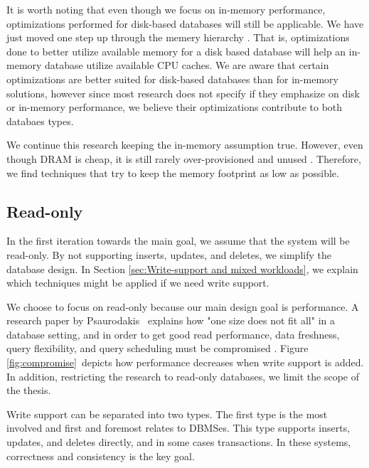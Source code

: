 It is worth noting that even though we focus on in-memory performance, optimizations performed for disk-based databases will still be applicable. We have just moved one step up through the memery hierarchy \cite{Boncz2002-yj}. That is, optimizations done to better utilize available memory for a disk based database will help an in-memory database utilize available CPU caches. We are aware that certain optimizations are better suited for disk-based databases than for in-memory solutions, however since most research does not specify if they emphasize on disk or in-memory performance, we believe their optimizations contribute to both databaes types. 

We continue this research keeping the in-memory assumption true. However, even though DRAM is cheap, it is still rarely over-provisioned and unused \cite{Barber2014-ey}. Therefore, we find techniques that try to keep the memory footprint as low as possible.

\subsection{Read-only}
\label{sub:Read-only}
In the first iteration towards the main goal, we assume that the system will be read-only. By not supporting inserts, updates, and deletes, we simplify the database design. In Section \ref{sec:Write-support and mixed workloads}, we explain which techniques might be applied if we need write support.

We choose to focus on read-only because our main design goal is performance. A research paper by Psaurodakis \ea~explains how "one size does not fit all" in a database setting, and in order to get good read performance, data freshness, query flexibility, and query scheduling must be compromised \cite{Psaroudakis2014-ma}. Figure \ref{fig:compromise}~depicts how performance decreases when write support is added. In addition, restricting the research to read-only databases, we limit the scope of the thesis. 

Write support can be separated into two types. The first type is the most involved and first and foremost relates to DBMSes. This type supports inserts, updates, and deletes directly, and in some cases transactions. In these systems, correctness and consistency is the key goal.

